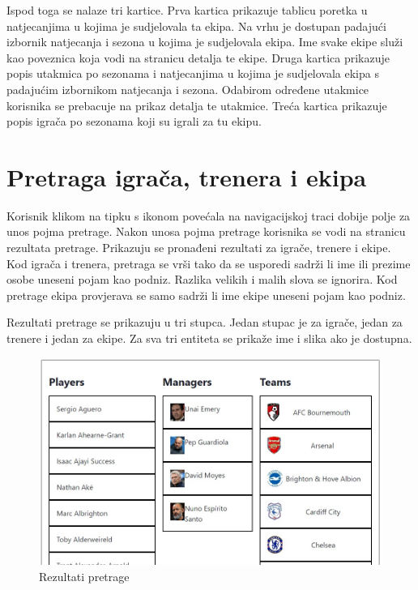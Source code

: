 \documentclass[times, utf8, zavrsni]{fer}
\begin{document}
Ispod toga se nalaze tri kartice. Prva kartica prikazuje tablicu poretka u natjecanjima u kojima je sudjelovala ta ekipa. Na vrhu je dostupan padajući izbornik natjecanja i sezona u kojima je sudjelovala ekipa.
Ime svake ekipe služi kao poveznica koja vodi na stranicu detalja te ekipe.
Druga kartica prikazuje popis utakmica po sezonama i natjecanjima u kojima je sudjelovala ekipa s padajućim izbornikom natjecanja i sezona. Odabirom određene utakmice korisnika se prebacuje na prikaz detalja te utakmice.
Treća kartica prikazuje popis igrača po sezonama koji su igrali za tu ekipu.

\section{Pretraga igrača, trenera i ekipa}

Korisnik klikom na tipku s ikonom povećala na navigacijskoj traci dobije polje za unos pojma pretrage. Nakon unosa pojma pretrage korisnika se vodi na stranicu rezultata pretrage.
Prikazuju se pronađeni rezultati za igrače, trenere i ekipe.
Kod igrača i trenera, pretraga se vrši tako da se usporedi sadrži li ime ili prezime osobe uneseni pojam kao podniz.
Razlika velikih i malih slova se ignorira. Kod pretrage ekipa provjerava se samo sadrži li ime ekipe uneseni pojam kao podniz.

Rezultati pretrage se prikazuju u tri stupca. Jedan stupac je za igrače, jedan za trenere i jedan za ekipe. Za sva tri entiteta se prikaže ime i slika ako je dostupna.

\begin{figure}[htb]
\centering
\includegraphics[width=14cm]{images/search.jpg}
\caption{Rezultati pretrage}
\label{fig:search}
\end{figure}
\end{document}
